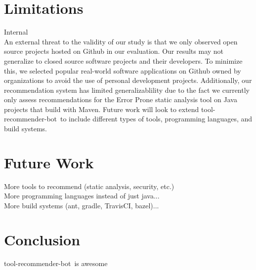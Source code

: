 \documentclass[conference]{IEEEtran}
\newcommand{\tool}{tool-recommender-bot}
\begin{document}
\section{Limitations}

Internal\\

An external threat to the validity of our study is that we only observed open source projects hosted on Github in our evaluation. Our results may not generalize to closed source software projects and their developers. To minimize this, we selected popular real-world software applications on Github owned by organizations to avoid the use of personal development projects. Additionally, our recommendation system has limited generalizablility due to the fact we currently only assess recommendations for the Error Prone static analysis tool on Java projects that build with Maven. Future work will look to extend \tool~to include different types of tools, programming languages, and build systems.

\section{Future Work}

More tools to recommend (static analysis, security, etc.) \\

More programming languages instead of just java...\\

More build systems (ant, gradle, TravisCI, bazel)...\\

\section{Conclusion}

\tool~is awesome




  
%

\end{document}
